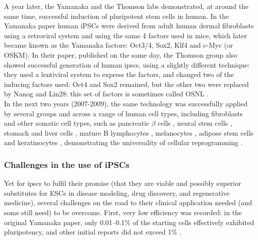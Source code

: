 A year later, the Yamanaka and the Thomson labs demonstrated, at around the same time, successful induction of pluripotent stem cells in human.
In the Yamanaka paper \cite{takahashi2007induction} human iPSCs were derived from adult human dermal fibroblasts using a retroviral system and using the same 4 factors used in mice, which later became known as the Yamanaka factors: Oct3/4, Sox2, Klf4 and c-Myc (or OSKM).
In their paper, published on the same day, the Thomson group also showed successful generation of human \glspl{ipsc}, using a slightly different technique: they used a lentiviral system to express the factors, and changed two of the inducing factors used: Oct4 and Sox2 remained, but the other two were replaced by Nanog and Lin28: this set of factors is sometimes called OSNL \cite{yu2007induced}.\\

In the next two years (2007-2009), the same technology was successfully applied by several groups and across a range of human cell types, including fibroblasts \cite{park2008reprogramming} and other somatic cell types, such as pancreatic $\beta$ cells \cite{stadtfeld2008reprogramming}, neural stem cells \cite{eminli2008reprogramming, kim2008pluripotent}, stomach and liver cells \cite{aoi2008generation}, mature B lymphocytes \cite{hanna2008direct}, melanocytes \cite{utikal2009sox2}, adipose stem cells \cite{sun2009feeder} and keratinocytes \cite{maherali2008high}, demonstrating the universality of cellular reprogramming \cite{omole2018ten}.


\subsubsection{Challenges in the use of iPSCs}
Yet for \glspl{ipsc} to fulfil their promise (that they are viable and possibly superior substitutes for ESCs in disease modeling, drug discovery, and regenerative medicine), several challenges on the road to their clinical application needed (and some still need) to be overcome.
First, very low efficiency was recorded: in the original Yamanaka paper, only 0.01–0.1\% \cite{takahashi2006induction} of the starting cells effectively exhibited pluripotency, and other initial reports did not exceed 1\% \cite{takahashi2007induction, okita2007generation, lowry2008generation}. \\

